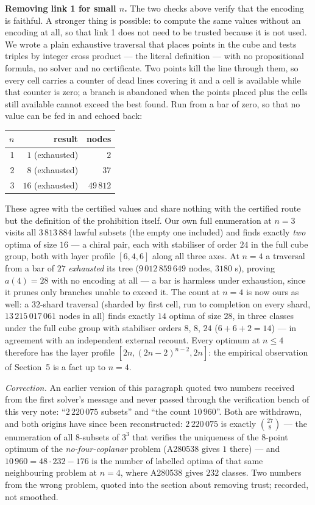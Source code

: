 \documentclass[11pt,a4paper]{article}
\begin{document}
\medskip\noindent\textbf{Removing link 1 for small $n$.}  The two checks above verify that the encoding is
faithful.  A stronger thing is possible: to compute the same values without an encoding at all, so that link 1
does not need to be trusted because it is not used.  We wrote a plain exhaustive traversal that places points
in the cube and tests triples by integer cross product --- the literal definition --- with no propositional
formula, no solver and no certificate.  Two points kill the line through them, so every cell carries a counter
of dead lines covering it and a cell is available while that counter is zero; a branch is abandoned when the
points placed plus the cells still available cannot exceed the best found.  Run from a bar of zero, so that no
value can be fed in and echoed back:
\begin{center}
\begin{tabular}{rrr}
\toprule
$n$ & result & nodes \\
\midrule
1 & $1$ (exhausted) & $2$\\
2 & $8$ (exhausted) & $37$\\
3 & $16$ (exhausted) & $49\,812$\\
\bottomrule
\end{tabular}
\end{center}
These agree with the certified values and share nothing with the certified route but the definition of the
prohibition itself.  Our own full enumeration at $n=3$ visits all $3\,813\,884$ lawful subsets (the empty one
included) and finds exactly \emph{two} optima of size $16$ --- a chiral pair, each with stabiliser of order $24$
in the full cube group, both with layer profile $[6,4,6]$ along all three axes.  At $n=4$ a traversal from a bar
of $27$ \emph{exhausted} its tree ($9\,012\,859\,649$ nodes, $3180$ s), proving $a(4)=28$ with no encoding at
all --- a bar is harmless under exhaustion, since it prunes only branches unable to exceed it.  The count at $n=4$
is now ours as well: a $32$-shard traversal (sharded by first cell, run to completion on every shard,
$13\,215\,017\,061$ nodes in all) finds exactly $14$ optima of size $28$, in three classes under the full cube
group with stabiliser orders $8$, $8$, $24$ ($6+6+2=14$) --- in agreement with an independent external recount.
Every optimum at $n\le4$ therefore has the layer profile $[2n,(2n-2)^{n-2},2n]$: the empirical observation of
Section~5 is a fact up to $n=4$.

\emph{Correction.}  An earlier version of this paragraph quoted two numbers received from the first solver's
message and never passed through the verification bench of this very note: ``$2\,220\,075$ subsets'' and ``the
count $10\,960$''.  Both are withdrawn, and both origins have since been reconstructed: $2\,220\,075$ is exactly
$\binom{27}{8}$ --- the enumeration of all $8$-subsets of $3^3$ that verifies the uniqueness of the $8$-point
optimum of the \emph{no-four-coplanar} problem (A280538 gives $1$ there) --- and $10\,960=48\cdot232-176$ is
the number of labelled optima of that same neighbouring problem at $n=4$, where A280538 gives $232$ classes.
Two numbers from the wrong problem, quoted into the section about removing trust; recorded, not smoothed.
\end{document}
